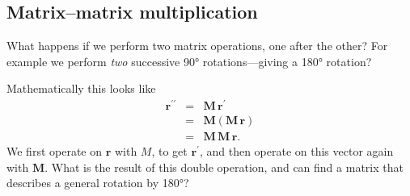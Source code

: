 \documentclass[a4paper]{article}
\newcommand{\bvec}[1]{\mathbf{#1}}
\begin{document}
\subsection{Matrix--matrix multiplication}
What happens if we perform two matrix operations, one after the other? For example we perform \emph{two} successive \ang{90} rotations---giving a \ang{180} rotation?

Mathematically this looks like
\begin{eqnarray*}
\bvec{r^{\prime\prime}}&=&\bvec{M}\,\bvec{r^\prime} \\
& = & \bvec{M}\left(\bvec{M}\,\bvec{r}\right) \\
& = & \bvec{M}\,\bvec{M}\,\bvec{r}.
\end{eqnarray*}
We first operate on $\bvec{r}$ with $M$, to get $\bvec{r^\prime}$, and then operate on this vector again with $\bvec{M}$. What is the result of this double operation, and can find a matrix that describes a general rotation by \ang{180}?
\end{document}
